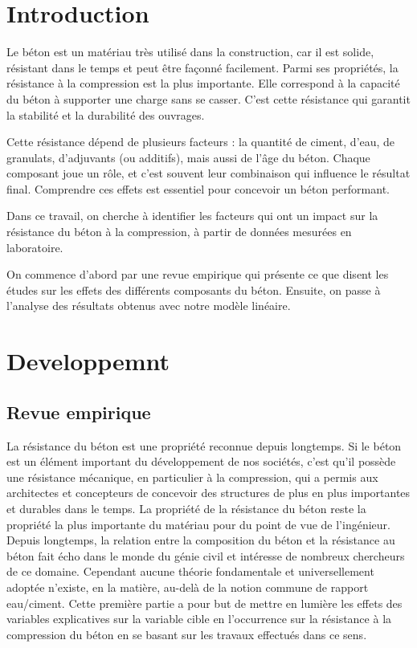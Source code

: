 \documentclass[
  12pt,
]{article}
\title{\fbox{\huge Regression Linéaire}}
\author{Dimitri DELPECH, \and Timothé FADENIPO, \and Matthis
ARVOIS, \and Ismael MADOU GAGI GREMA, \and Cheikh LO}
\date{2025-04-10}
\begin{document}
\maketitle

{
\setcounter{tocdepth}{2}
\tableofcontents
}
\newpage

\section{Introduction}\label{introduction}

Le béton est un matériau très utilisé dans la construction, car il est
solide, résistant dans le temps et peut être façonné facilement. Parmi
ses propriétés, la résistance à la compression est la plus importante.
Elle correspond à la capacité du béton à supporter une charge sans se
casser. C'est cette résistance qui garantit la stabilité et la
durabilité des ouvrages.

Cette résistance dépend de plusieurs facteurs : la quantité de ciment,
d'eau, de granulats, d'adjuvants (ou additifs), mais aussi de l'âge du
béton. Chaque composant joue un rôle, et c'est souvent leur combinaison
qui influence le résultat final. Comprendre ces effets est essentiel
pour concevoir un béton performant.

Dans ce travail, on cherche à identifier les facteurs qui ont un impact
sur la résistance du béton à la compression, à partir de données
mesurées en laboratoire.

On commence d'abord par une revue empirique qui présente ce que disent
les études sur les effets des différents composants du béton. Ensuite,
on passe à l'analyse des résultats obtenus avec notre modèle linéaire.

\section{Developpemnt}\label{developpemnt}

\subsection{Revue empirique}\label{revue-empirique}

La résistance du béton est une propriété reconnue depuis longtemps. Si
le béton est un élément important du développement de nos sociétés,
c'est qu'il possède une résistance mécanique, en particulier à la
compression, qui a permis aux architectes et concepteurs de concevoir
des structures de plus en plus importantes et durables dans le temps. La
propriété de la résistance du béton reste la propriété la plus
importante du matériau pour du point de vue de l'ingénieur. Depuis
longtemps, la relation entre la composition du béton et la résistance au
béton fait écho dans le monde du génie civil et intéresse de nombreux
chercheurs de ce domaine. Cependant aucune théorie fondamentale et
universellement adoptée n'existe, en la matière, au-delà de la notion
commune de rapport eau/ciment. Cette première partie a pour but de
mettre en lumière les effets des variables explicatives sur la variable
cible en l'occurrence sur la résistance à la compression du béton en se
basant sur les travaux effectués dans ce sens.
\end{document}
